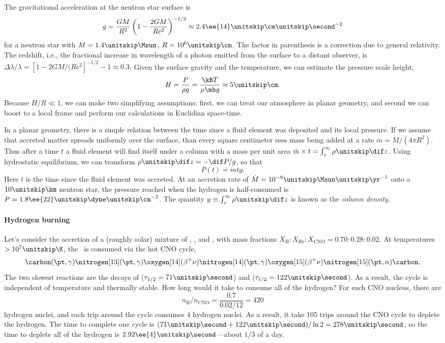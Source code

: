 The gravitational acceleration at the neutron star surface is
\[
	g = \frac{GM}{R^{2}}\left(1-\frac{2GM}{Rc^{2}}\right)^{-1/2}\approx 2.4\ee{14}\nsp\cm\usp\second^{-2}
\]
for a neutron star with $M = 1.4\nsp\Msun$, $R = 10^{6}\nsp\cm$.  The factor in parenthesis is a correction due to general relativity. The redshift, i.e., the fractional increase in wavelength of a photon emitted from the surface to a distant observer, is $\Delta \lambda/\lambda = [1-2GM/(Rc^{2}]^{-1/2} - 1 \approx 0.3$.   Given the surface gravity and the temperature, we can estimate the pressure scale height,
\[
 H = \frac{P}{\rho g} = \frac{\kB T}{\mu\mb g} \approx 5\nsp\cm.
\]
Because $H/R\ll 1$, we can make two simplifying assumptions: first, we can treat our atmosphere in planar geometry, and second we can boost to a local frame and perform our calculations in Euclidian space-time.

In a planar geometry, there is a simple relation between the time since a fluid element was deposited and its local pressure. If we assume that accreted matter spreads uniformly over the surface, than every square centimeter sees mass being added at a rate $\dot{m} = \dot{M}/(4\pi R^{2})$.  Thus after a time $t$ a fluid element will find itself under a column with a mass per unit area $\dot{m}\times t = \int_{z}^{\infty}\rho\usp\dif z$. Using hydrostatic equilibrium, we can transform $\rho\usp\dif z = -\dif P/g$, so that
\[
P(t) = \dot{m}tg.
\]
Here $t$ is the time since the fluid element was accreted.  At an accretion rate of $\dot{M} = 10^{-9}\nsp\Msun\usp\yr^{-1}$ onto a $10\nsp\km$ neutron star, the pressure reached when the hydrogen is half-consumed is $P = 1.8\ee{22}\nsp\dyne\usp\cm^{-2}$.  The quantity $y\equiv \int_{z}^{\infty}\rho\usp\dif z$ is known as the \emph{column density}.

\paragraph{Hydrogen burning}
Let's consider the accretion of a (roughly solar) mixture of \hydrogen, \helium, and \carbon, with mass fractions $X_{\mathrm{H}}:X_{\mathrm{He}}:X_{\mathrm{CNO}} = 0.70:0.28:0.02$. At temperatures $> 10^{7}\nsp\K$, the \hydrogen\ is consumed via the hot CNO cycle,
\[
	\carbon(\pt,\gamma)\nitrogen[13](\pt,\gamma)\oxygen[14](\beta^{+}\nu)\nitrogen[14](\pt,\gamma) \oxygen[15](\beta^{+}\nu)\nitrogen[15](\pt,\alpha)\carbon.
\]
The two slowest  reactions are the decays of \oxygen[14] ($\tau_{1/2} = 71\nsp\second$) and \oxygen[15] ($\tau_{1/2} = 122\nsp\second$). As a result, the cycle is independent of temperature and thermally stable.
How long would it take to consume all of the hydrogen?  For each CNO nucleus, there are
\[ n_{\mathrm{H}}/n_{\mathrm{CNO}} = \frac{0.7}{0.02/12} = 420 \]
hydrogen nuclei, and each trip around the cycle consumes 4 hydrogen nuclei. As a result, it take 105 trips around the CNO cycle to deplete the hydrogen.  The time to complete one cycle is $(71\nsp\second + 122\nsp\second) /\ln 2 = 278\nsp\second$, so the time to deplete all of the hydrogen is $2.92\ee{4}\nsp\second$---about $1/3$ of a day.

